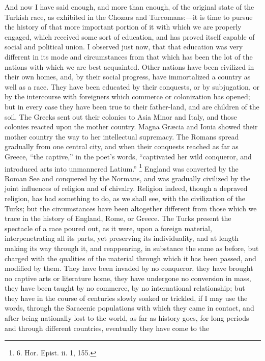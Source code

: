 And now I have said enough,
and more than enough, of the original state of the Turkish race, as
exhibited in the Chozars and Turcomans:—it is time to pursue the
history of that more important portion of it with which we are
properly engaged, which received some sort of education, and has
proved itself capable of social and political union. I observed just
now, that that education was very different in its mode and
circumstances from that which has been the lot of the nations with
which we are best acquainted. Other nations have been civilized in
their own homes, and, by their social progress, have immortalized a
country as well as a race. They have been educated by their conquests,
or by subjugation, or by the intercourse with foreigners which
commerce or colonization has opened; but in every case they have
been true to their father-land, and are children of the soil. The
Greeks sent out their colonies to Asia Minor and Italy, and those
colonies reacted upon the mother country. Magna Græcia and Ionia
showed their mother country the way to her intellectual supremacy. The
Romans spread gradually from one central city, and when their
conquests reached as far as Greece, ``the captive,'' in the poet's
words, ``captivated her wild conqueror, and introduced arts into
unmannered Latium.'' \footnote{6.
Hor. Epist. ii. 1, 155.}
England was converted by the Roman See and conquered by the Normans,
and was gradually civilized by the joint influences of religion and of
chivalry. Religion indeed, though a depraved religion, has had
something to do, as we shall see, with the civilization of the Turks;
but the circumstances have been altogether different from those which
we trace in the history of England, Rome, or Greece. The Turks present
the spectacle of a race poured out, as it were, upon a foreign
material, interpenetrating all its parts, yet preserving its
individuality, and at length making its way through it, and
reappearing, in substance the same as before, but charged with the
qualities of the material through which it has been passed, and
modified by them. They have been invaded by no conqueror, they have
brought no captive arts or literature home, they have undergone no
conversion in mass, they have been taught by no commerce, by no
international relationship; but they have in the course of centuries
slowly soaked or trickled, if I may use the words, through the
Saracenic populations with which they came in contact, and after being
nationally lost to the world, as far as history goes, for long periods
and through different countries, eventually they have come to the
